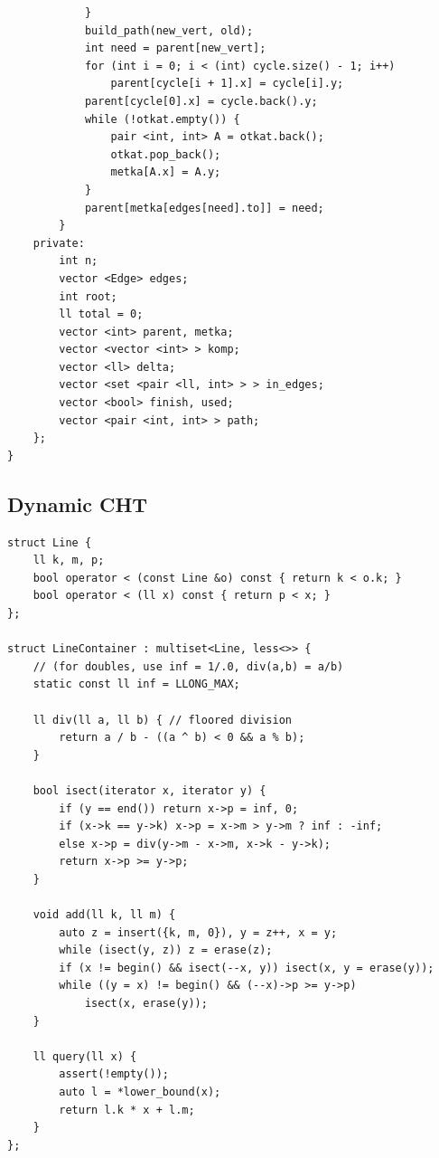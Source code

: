\documentclass[10pt, portrait,letterpaper]{article}
\begin{document}
\begin{verbatim}
            }
            build_path(new_vert, old);
            int need = parent[new_vert];
            for (int i = 0; i < (int) cycle.size() - 1; i++)
                parent[cycle[i + 1].x] = cycle[i].y;
            parent[cycle[0].x] = cycle.back().y;
            while (!otkat.empty()) {
                pair <int, int> A = otkat.back();
                otkat.pop_back();
                metka[A.x] = A.y;
            }
            parent[metka[edges[need].to]] = need;
        }
    private:
        int n;
        vector <Edge> edges;
        int root;
        ll total = 0;
        vector <int> parent, metka;
        vector <vector <int> > komp;
        vector <ll> delta;
        vector <set <pair <ll, int> > > in_edges;
        vector <bool> finish, used;
        vector <pair <int, int> > path;
    };
}
\end{verbatim}

\subsection{Dynamic CHT}
\begin{verbatim}
struct Line {
    ll k, m, p;
    bool operator < (const Line &o) const { return k < o.k; }
    bool operator < (ll x) const { return p < x; }
};

struct LineContainer : multiset<Line, less<>> {
    // (for doubles, use inf = 1/.0, div(a,b) = a/b)
    static const ll inf = LLONG_MAX;
    
    ll div(ll a, ll b) { // floored division
        return a / b - ((a ^ b) < 0 && a % b);
    }
    
    bool isect(iterator x, iterator y) {
        if (y == end()) return x->p = inf, 0;
        if (x->k == y->k) x->p = x->m > y->m ? inf : -inf;
        else x->p = div(y->m - x->m, x->k - y->k);
        return x->p >= y->p;
    }

    void add(ll k, ll m) {
        auto z = insert({k, m, 0}), y = z++, x = y;
        while (isect(y, z)) z = erase(z);
        if (x != begin() && isect(--x, y)) isect(x, y = erase(y));
        while ((y = x) != begin() && (--x)->p >= y->p)
            isect(x, erase(y));
    }

    ll query(ll x) {
        assert(!empty());
        auto l = *lower_bound(x);
        return l.k * x + l.m;
    }
};
\end{verbatim}
\end{document}
